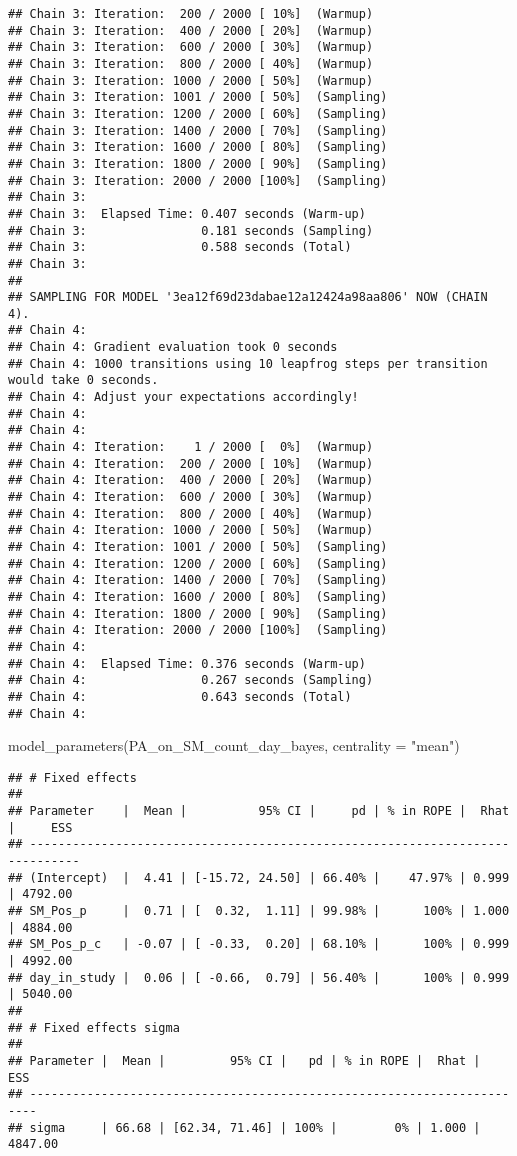 \documentclass[
]{article}
\newenvironment{Shaded}{\begin{snugshade}}{\end{snugshade}}
\newcommand{\AttributeTok}[1]{\textcolor[rgb]{0.77,0.63,0.00}{#1}}
\newcommand{\FunctionTok}[1]{\textcolor[rgb]{0.00,0.00,0.00}{#1}}
\newcommand{\NormalTok}[1]{#1}
\newcommand{\StringTok}[1]{\textcolor[rgb]{0.31,0.60,0.02}{#1}}
\begin{document}
\begin{verbatim}
## Chain 3: Iteration:  200 / 2000 [ 10%]  (Warmup)
## Chain 3: Iteration:  400 / 2000 [ 20%]  (Warmup)
## Chain 3: Iteration:  600 / 2000 [ 30%]  (Warmup)
## Chain 3: Iteration:  800 / 2000 [ 40%]  (Warmup)
## Chain 3: Iteration: 1000 / 2000 [ 50%]  (Warmup)
## Chain 3: Iteration: 1001 / 2000 [ 50%]  (Sampling)
## Chain 3: Iteration: 1200 / 2000 [ 60%]  (Sampling)
## Chain 3: Iteration: 1400 / 2000 [ 70%]  (Sampling)
## Chain 3: Iteration: 1600 / 2000 [ 80%]  (Sampling)
## Chain 3: Iteration: 1800 / 2000 [ 90%]  (Sampling)
## Chain 3: Iteration: 2000 / 2000 [100%]  (Sampling)
## Chain 3: 
## Chain 3:  Elapsed Time: 0.407 seconds (Warm-up)
## Chain 3:                0.181 seconds (Sampling)
## Chain 3:                0.588 seconds (Total)
## Chain 3: 
## 
## SAMPLING FOR MODEL '3ea12f69d23dabae12a12424a98aa806' NOW (CHAIN 4).
## Chain 4: 
## Chain 4: Gradient evaluation took 0 seconds
## Chain 4: 1000 transitions using 10 leapfrog steps per transition would take 0 seconds.
## Chain 4: Adjust your expectations accordingly!
## Chain 4: 
## Chain 4: 
## Chain 4: Iteration:    1 / 2000 [  0%]  (Warmup)
## Chain 4: Iteration:  200 / 2000 [ 10%]  (Warmup)
## Chain 4: Iteration:  400 / 2000 [ 20%]  (Warmup)
## Chain 4: Iteration:  600 / 2000 [ 30%]  (Warmup)
## Chain 4: Iteration:  800 / 2000 [ 40%]  (Warmup)
## Chain 4: Iteration: 1000 / 2000 [ 50%]  (Warmup)
## Chain 4: Iteration: 1001 / 2000 [ 50%]  (Sampling)
## Chain 4: Iteration: 1200 / 2000 [ 60%]  (Sampling)
## Chain 4: Iteration: 1400 / 2000 [ 70%]  (Sampling)
## Chain 4: Iteration: 1600 / 2000 [ 80%]  (Sampling)
## Chain 4: Iteration: 1800 / 2000 [ 90%]  (Sampling)
## Chain 4: Iteration: 2000 / 2000 [100%]  (Sampling)
## Chain 4: 
## Chain 4:  Elapsed Time: 0.376 seconds (Warm-up)
## Chain 4:                0.267 seconds (Sampling)
## Chain 4:                0.643 seconds (Total)
## Chain 4:
\end{verbatim}

\begin{Shaded}
\begin{Highlighting}[]
\FunctionTok{model\_parameters}\NormalTok{(PA\_on\_SM\_count\_day\_bayes, }\AttributeTok{centrality =} \StringTok{"mean"}\NormalTok{)}
\end{Highlighting}
\end{Shaded}

\begin{verbatim}
## # Fixed effects
## 
## Parameter    |  Mean |          95% CI |     pd | % in ROPE |  Rhat |     ESS
## -----------------------------------------------------------------------------
## (Intercept)  |  4.41 | [-15.72, 24.50] | 66.40% |    47.97% | 0.999 | 4792.00
## SM_Pos_p     |  0.71 | [  0.32,  1.11] | 99.98% |      100% | 1.000 | 4884.00
## SM_Pos_p_c   | -0.07 | [ -0.33,  0.20] | 68.10% |      100% | 0.999 | 4992.00
## day_in_study |  0.06 | [ -0.66,  0.79] | 56.40% |      100% | 0.999 | 5040.00
## 
## # Fixed effects sigma
## 
## Parameter |  Mean |         95% CI |   pd | % in ROPE |  Rhat |     ESS
## -----------------------------------------------------------------------
## sigma     | 66.68 | [62.34, 71.46] | 100% |        0% | 1.000 | 4847.00
\end{verbatim}
\end{document}
